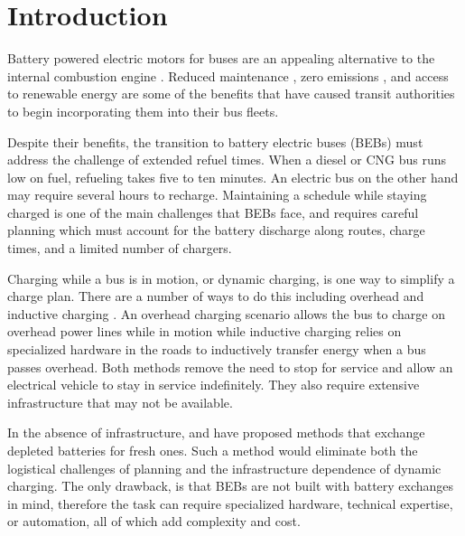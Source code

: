 \section{Introduction}
\par  Battery powered electric motors for buses are an appealing alternative to the internal combustion engine \cite{Mahmoud2016}. Reduced maintenance \cite{poornesh_comparative_2020}, zero emissions \cite{kato_comparative_2013}, and access to renewable energy \cite{cheng_smart_2020} are some of the benefits that have caused transit authorities to begin incorporating them into their bus fleets.  
\par Despite their benefits, the transition to battery electric buses (BEBs) must address the challenge of extended refuel times. When a diesel or CNG bus runs low on fuel, refueling takes five to ten minutes.  An electric bus on the other hand may require several hours to recharge. Maintaining a schedule while staying charged is one of the main challenges that BEBs face, and requires careful planning which must account for the battery discharge along routes, charge times, and a limited number of chargers. 
\par Charging while a bus is in motion, or dynamic charging, is one way to simplify a charge plan. There are a number of ways to do this including overhead \cite{csonka_optimization_2021} and inductive charging \cite{jeong_automatic_2018} \cite{balde_electric_2019}. An overhead charging scenario allows the bus to charge on overhead power lines while in motion while inductive charging relies on specialized hardware in the roads to inductively transfer energy when a bus passes overhead. Both methods remove the need to stop for service and allow an electrical vehicle to stay in service indefinitely. They also require extensive infrastructure \cite{Alwesabi_2022_Robust} that may not be available.

\par In the absence of infrastructure, \cite{jain_battery_2020} and \cite{xian_zhang_optimal_2016} have proposed methods that exchange depleted batteries for fresh ones. Such a method would eliminate both the logistical challenges of planning and the infrastructure dependence of dynamic charging. The only drawback, is that BEBs are not built with battery exchanges in mind, therefore the task can require specialized hardware, technical expertise, or automation, all of which add complexity and cost.

